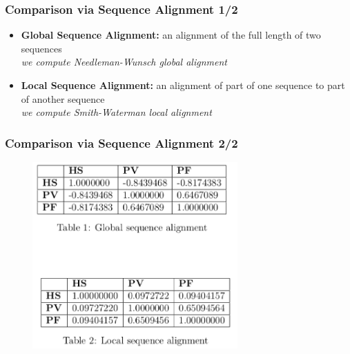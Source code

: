 \documentclass[compress]{beamer}
\begin{document}
\begin{frame}
\frametitle{Comparison via Sequence Alignment 1/2} 
\begin{itemize}%
 \item \textbf{Global Sequence Alignment:} an alignment of the full length of two sequences\\
    \textit{we compute Needleman-Wunsch global alignment}
 \item \textbf{Local Sequence Alignment:} an alignment of part of one sequence to part of another sequence\\
   \textit{we compute Smith-Waterman local alignment}
 
 \end{itemize}
\end{frame}

\begin{frame}
\frametitle{Comparison via Sequence Alignment 2/2} 

\begin{figure}[h!]
  \centering
    \includegraphics[width=0.7\textwidth]{seq}
\end{figure}

\end{frame}
\end{document}
